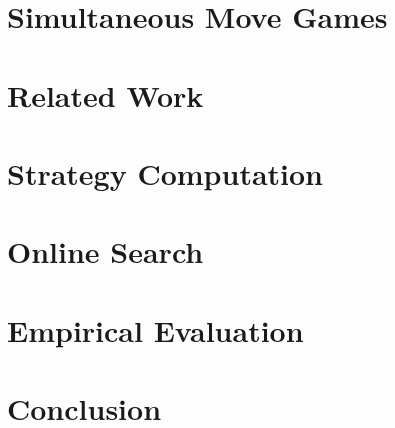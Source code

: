 \documentclass[preprint,12pt]{elsarticle}
\begin{document}
\section{Simultaneous Move Games}  \label{sec:smg}

 \label{sec:smgames}

\section{Related Work}



\section{Strategy Computation}



\section{Online Search}\label{sec:online}



\section{Empirical Evaluation} \label{sec:eval}



\section{Conclusion}











\end{document}
